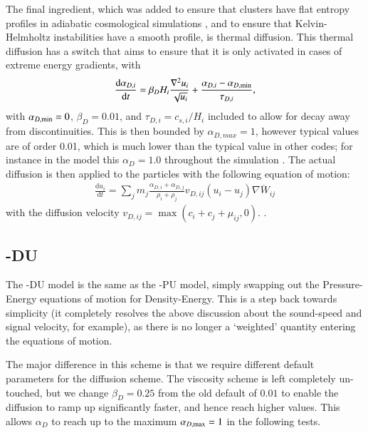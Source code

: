 The final ingredient, which was added to ensure that clusters have flat entropy 
profiles in adiabatic cosmological simulations \citep{Sembolini2016}, and to ensure
that Kelvin-Helmholtz instabilities have a smooth profile, is thermal diffusion. This
thermal diffusion has a switch that aims to ensure that it is only activated in cases
of extreme energy gradients, with
\begin{equation}
    \frac{
        \mathrm{d} \alpha_{D, i}
    }{
        \mathrm{d} t
    } = \beta_D H_i \frac{\nabla^2 u_i}{\sqrt{u_i}} + 
        \frac{\alpha_{D, i} - \alpha_{D, {\rm min}}}{\tau_{D, i}},
\end{equation}
with $\alpha_{D, {\rm min}} = 0$, $\beta_D = 0.01$, and $\tau_{D, i} = c_{s,
i}/{H_i}$ included to allow for decay away from discontinuities. This is then
bounded by $\alpha_{D, max} = 1$, however typical values are of order 0.01,
which is much lower than the typical value in other codes; for instance in
the  model this $\alpha_D = 1.0$ throughout the simulation
\citep{Price2018}. The actual diffusion is then applied to the particles with
the following equation of motion:
\begin{align}
    \frac{
        \mathrm{d}u_i
    }{
        \mathrm{d}t
    } = 
    \sum_j m_j \frac{\alpha_{D, i} + \alpha_{D, j}}{\rho_i + \rho_j} v_{D, ij} (u_i - u_j) \overline{\nabla W_{ij}}
    \label{eqn:energydiff}
\end{align}
with the diffusion velocity $v_{D, ij} = \max(c_i + c_j + \mu_{ij}, 0)$.
.

\subsection{\anarchy{}-DU}

The \anarchy{}-DU model is the same as the \anarchy{}-PU model, simply swapping out the
Pressure-Energy equations of motion for Density-Energy. This is a step back towards
simplicity (it completely resolves the above discussion about the sound-speed and
signal velocity, for example), as there is no longer a `weighted' quantity entering the
equations of motion.

The major difference in this scheme is that we require different default parameters
for the diffusion scheme. The viscosity scheme is left completely un-touched, but we change
$\beta_D = 0.25$ from the old default of $0.01$ to enable the diffusion to ramp
up significantly faster, and hence reach higher values. This allows $\alpha_D$ to reach
up to the maximum $\alpha_{D, {\rm max}} = 1$ in the following tests.